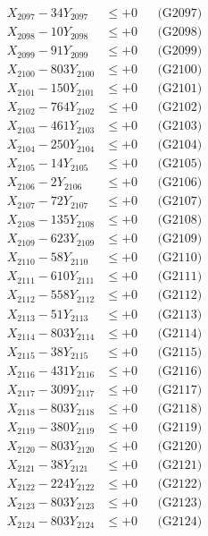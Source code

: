 \documentclass[a4paper,10pt]{article}
\begin{document}
{\begin{align}
X_{2097} - 34Y_{2097} &\leq +0 && \text{(G2097)} \\
X_{2098} - 10Y_{2098} &\leq +0 && \text{(G2098)} \\
X_{2099} - 91Y_{2099} &\leq +0 && \text{(G2099)} \\
X_{2100} - 803Y_{2100} &\leq +0 && \text{(G2100)} \\
\allowbreak
X_{2101} - 150Y_{2101} &\leq +0 && \text{(G2101)} \\
X_{2102} - 764Y_{2102} &\leq +0 && \text{(G2102)} \\
X_{2103} - 461Y_{2103} &\leq +0 && \text{(G2103)} \\
X_{2104} - 250Y_{2104} &\leq +0 && \text{(G2104)} \\
X_{2105} - 14Y_{2105} &\leq +0 && \text{(G2105)} \\
X_{2106} - 2Y_{2106} &\leq +0 && \text{(G2106)} \\
X_{2107} - 72Y_{2107} &\leq +0 && \text{(G2107)} \\
X_{2108} - 135Y_{2108} &\leq +0 && \text{(G2108)} \\
X_{2109} - 623Y_{2109} &\leq +0 && \text{(G2109)} \\
X_{2110} - 58Y_{2110} &\leq +0 && \text{(G2110)} \\
\allowbreak
X_{2111} - 610Y_{2111} &\leq +0 && \text{(G2111)} \\
X_{2112} - 558Y_{2112} &\leq +0 && \text{(G2112)} \\
X_{2113} - 51Y_{2113} &\leq +0 && \text{(G2113)} \\
X_{2114} - 803Y_{2114} &\leq +0 && \text{(G2114)} \\
X_{2115} - 38Y_{2115} &\leq +0 && \text{(G2115)} \\
X_{2116} - 431Y_{2116} &\leq +0 && \text{(G2116)} \\
X_{2117} - 309Y_{2117} &\leq +0 && \text{(G2117)} \\
X_{2118} - 803Y_{2118} &\leq +0 && \text{(G2118)} \\
X_{2119} - 380Y_{2119} &\leq +0 && \text{(G2119)} \\
X_{2120} - 803Y_{2120} &\leq +0 && \text{(G2120)} \\
\allowbreak
X_{2121} - 38Y_{2121} &\leq +0 && \text{(G2121)} \\
X_{2122} - 224Y_{2122} &\leq +0 && \text{(G2122)} \\
X_{2123} - 803Y_{2123} &\leq +0 && \text{(G2123)} \\
X_{2124} - 803Y_{2124} &\leq +0 && \text{(G2124)} \\

\end{align}}
\end{document}
